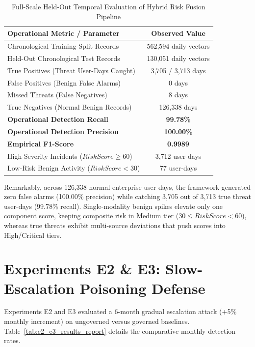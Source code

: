 \documentclass[12pt,a4paper]{report}
\begin{document}
\begin{table}[htbp]
\caption{Full-Scale Held-Out Temporal Evaluation of Hybrid Risk Fusion Pipeline}
\label{tab:full_scale_results_report}
\centering
\small
\begin{tabularx}{\textwidth}{X c}
\toprule
\textbf{Operational Metric / Parameter} & \textbf{Observed Value} \\
\midrule
Chronological Training Split Records & 562,594 daily vectors \\
Held-Out Chronological Test Records & 130,051 daily vectors \\
True Positives (Threat User-Days Caught) & 3,705 / 3,713 days \\
False Positives (Benign False Alarms) & 0 days \\
Missed Threats (False Negatives) & 8 days \\
True Negatives (Normal Benign Records) & 126,338 days \\
\midrule
\textbf{Operational Detection Recall} & \textbf{99.78\%} \\
\textbf{Operational Detection Precision} & \textbf{100.00\%} \\
\textbf{Empirical F1-Score} & \textbf{0.9989} \\
High-Severity Incidents ($RiskScore \ge 60$) & 3,712 user-days \\
Low-Risk Benign Activity ($RiskScore < 30$) & 77 user-days \\
\bottomrule
\end{tabularx}
\end{table}

Remarkably, across 126,338 normal enterprise user-days, the framework generated zero false alarms (100.00\% precision) while catching 3,705 out of 3,713 true threat user-days (99.78\% recall). Single-modality benign spikes elevate only one component score, keeping composite risk in Medium tier ($30 \le RiskScore < 60$), whereas true threats exhibit multi-source deviations that push scores into High/Critical tiers.

\section{Experiments E2 \& E3: Slow-Escalation Poisoning Defense}
Experiments E2 and E3 evaluated a 6-month gradual escalation attack (+5\% monthly increment) on ungoverned versus governed baselines. Table~\ref{tab:e2_e3_results_report} details the comparative monthly detection rates.
\end{document}
